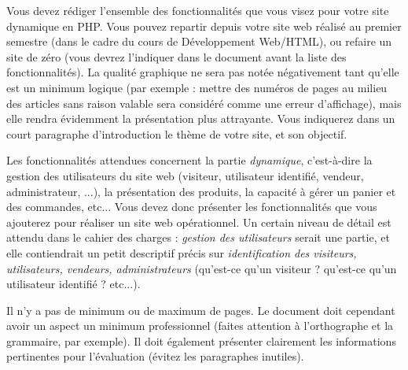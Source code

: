 

\vspace*{0.7cm}

\noindent {}

\bigskip

\noindent Vous devez rédiger l'ensemble des fonctionnalités que vous visez pour votre site dynamique en PHP.
Vous pouvez repartir depuis votre site web réalisé au premier semestre (dans le cadre du cours de Développement Web/HTML), ou refaire un site de zéro (vous devrez l'indiquer dans le document avant la liste des fonctionnalités).
La qualité graphique ne sera pas notée négativement tant qu'elle est un minimum logique (par exemple : mettre des numéros de pages au milieu des articles sans raison valable sera considéré comme une erreur d'affichage), mais elle rendra évidemment la présentation plus attrayante.
Vous indiquerez dans un court paragraphe d'introduction le thème de votre site, et son objectif.

Les fonctionnalités attendues concernent la partie \textit{dynamique}, c'est-à-dire la gestion des utilisateurs du site web (visiteur, utilisateur identifié, vendeur, administrateur, ...), la présentation des produits, la capacité à gérer un panier et des commandes, etc...
Vous devez donc présenter les fonctionnalités que vous ajouterez pour réaliser un site web opérationnel.
Un certain niveau de détail est attendu dans le cahier des charges : \textit{gestion des utilisateurs} serait une partie, et elle contiendrait un petit descriptif précis sur \textit{identification des visiteurs, utilisateurs, vendeurs, administrateurs} (qu'est-ce qu'un visiteur ? qu'est-ce qu'un utilisateur identifié ? etc...).

\bigskip

\noindent Il n'y a pas de minimum ou de maximum de pages.
Le document doit cependant avoir un aspect un minimum professionnel (faites attention à l'orthographe et la grammaire, par exemple).
Il doit également présenter clairement les informations pertinentes pour l'évaluation (évitez les paragraphes inutiles).

